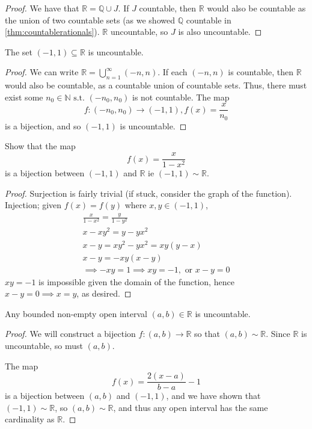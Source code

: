 \documentclass[12pt]{article}
\begin{document}
\begin{proof}
  We have that $\mathbb{R} = \mathbb{Q} \cup J$. If $J$ countable, then $\mathbb{R}$ would also be countable as the union of two countable sets (as we showed $\mathbb{Q}$ countable in \cref{thm:countablerationals}). $\mathbb{R}$ uncountable, so $J$ is also uncountable.
\end{proof}

\begin{proposition}
  The set $(-1,1) \subseteq \mathbb{R}$ is uncountable.
\end{proposition}

\begin{proof}
  We can write $\mathbb{R} = \bigcup_{n=1}^\infty (-n,n)$. If each $(-n,n)$ is countable, then $\mathbb{R}$ would also be countable, as a countable union of countable sets. Thus, there must exist some $n_0 \in \mathbb{N} \text{ s.t. } (-n_0, n_0)$ is not countable. The map\[f: (-n_0, n_0) \to (-1,1), f(x) = \frac{x}{n_0}\] is a bijection, and so $(-1,1)$ is uncountable.
\end{proof}

\begin{example}
  Show that the map \[f(x) = \frac{x}{1-x^2}\] is a bijection between $(-1,1)$ and $\mathbb{R}$ ie $(-1,1) \sim \mathbb{R}$.
\end{example}

\begin{proof}
  Surjection is fairly trivial (if stuck, consider the graph of the function).\\Injection; given $f(x) = f(y)$ where $x,y \in (-1,1)$,\begin{align*}
    \frac{x}{1-x^2} = \frac{y}{1-y^2}\\
    x -xy^2 = y - yx^2\\
    x-y = xy^2 - yx^2 = xy(y - x)\\
    x-y = -xy(x-y)\\
    \implies -xy = 1 \implies xy = -1, \text{ or } x - y = 0
  \end{align*}
  $xy = -1$ is impossible given the domain of the function, hence $x -y = 0 \implies x = y$, as desired.
\end{proof}



\begin{proposition}
  Any bounded non-empty open interval $(a,b) \in \mathbb{R}$ is uncountable.
\end{proposition}

\begin{proof}
  We will construct a bijection $f: (a,b) \to \mathbb{R}$ so that $(a,b) \sim \mathbb{R}$. Since $\mathbb{R}$ is  uncountable, so must $(a,b)$. 
  
  The map \[f(x)=\frac{2(x-a)}{b-a} - 1\] is a bijection between $(a,b)$ and $(-1,1)$, and we have shown that $(-1,1) \sim \mathbb{R}$, so $(a,b) \sim \mathbb{R}$, and thus any open interval has the same cardinality as $\mathbb{R}$.
\end{proof}
\end{document}

